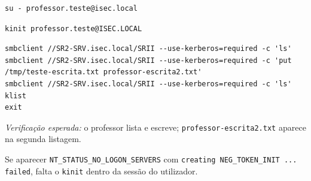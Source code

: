 \begin{lstlisting}[style=bashstyle]
su - professor.teste@isec.local
\end{lstlisting}


\begin{lstlisting}[style=bashstyle]
kinit professor.teste@ISEC.LOCAL
\end{lstlisting}


\begin{lstlisting}[style=bashstyle]
smbclient //SR2-SRV.isec.local/SRII --use-kerberos=required -c 'ls'
smbclient //SR2-SRV.isec.local/SRII --use-kerberos=required -c 'put /tmp/teste-escrita.txt professor-escrita2.txt'
smbclient //SR2-SRV.isec.local/SRII --use-kerberos=required -c 'ls'
klist
exit
\end{lstlisting}

\emph{Verificação esperada:} o professor lista e escreve; \texttt{professor-escrita2.txt} aparece na segunda listagem.

\begin{simplesbox}
Se aparecer \texttt{NT\_STATUS\_NO\_LOGON\_SERVERS} com \texttt{creating NEG\_TOKEN\_INIT ... failed}, falta o \texttt{kinit} dentro da sessão do utilizador.
\end{simplesbox}

